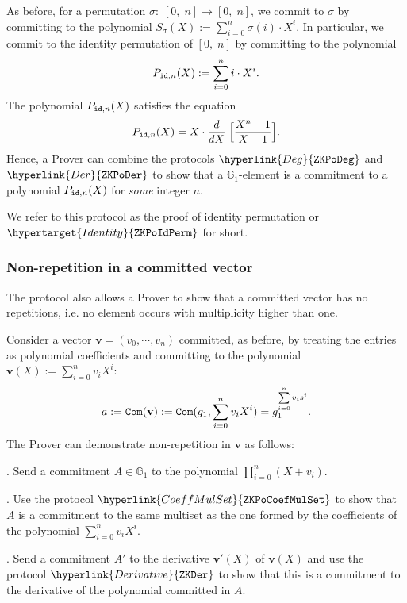 \documentclass[11pt, lettersize, notitlepage, leqno, footskip=0.6cm]{article}
\newcommand{\lra}{\longrightarrow}
\newcommand{\mb}{\mathbb}
\newcommand{\mbf}{\mathbf}
\newcommand{\vs}{\vspace{-0.15cm}}
\newcommand{\noin}{\noindent}
\numberwithin{equation}{section}
\begin{document}
As before, for a permutation $\sigma:\;[0,\;n]\lra [0,\; n]$, we commit to $\sigma$ by committing to the polynomial $S_{\sigma}(X):= \sum_{i=0}^n \sigma(i)\cdot X^i .$ In particular, we commit to the identity permutation of $[0,\;n]$ by committing to the polynomial \vs $$ P_{{\tt{id}}, n}(X):=  \sum\limits_{i=0}^n i\cdot X^i.$$ The polynomial $P_{{\tt{id}}, n}(X)$ satisfies the equation \vs $$ P_{{\tt{id}}, n}(X) = X\cdot \frac{d}{dX}\;\Big[ \frac{X^{n}-1}{X-1} \Big].   $$ Hence, a Prover can combine the protocols $\hyperlink{Deg}{\tt{ZKPoDeg}}$ and $\hyperlink{Der}{\tt{ZKPoDer}}$ to show that a $\mb{G}_1$-element is a commitment to a polynomial $P_{{\tt{id}}, n}(X)$ for \textit{some} integer $n$.

We refer to this protocol as the proof of identity permutation or $\hypertarget{Identity}{\tt{ZKPoIdPerm}}$ for short.


\subsubsection{\fontsize{11}{11}\selectfont Non-repetition in a committed vector}


The protocol also allows a Prover to show that a committed vector has no repetitions, i.e. no element occurs with multiplicity higher than one. 

Consider a vector $\mbf{v} = (v_0,\cdots,v_n)$ committed, as before, by treating the entries as polynomial coefficients and committing to the polynomial $\mbf{v}(X):= \sum_{i=0}^n v_iX^i$: \vs $$ a:= {\tt{Com}}(\mbf{v}):= {\tt{Com}}(g_1,\sum\limits_{i=0}^n v_iX^i ) =  g_1^{\sum\limits_{i=0}^n v_i s^i}. $$ The Prover can demonstrate non-repetition in $\mbf{v}$ as follows: \vspace{2mm}

\noin 1. Send a commitment $A\in \mb{G}_1$ to the polynomial $\prod\limits_{i=0}^n (X+v_i)$. \vspace{1mm}

\noin 2. Use the protocol $\hyperlink{CoeffMulSet}{\tt{ZKPoCoefMulSet}}$ to show that $A$ is a commitment to the same multiset as the one formed by the coefficients of the polynomial $\sum_{i=0}^n v_iX^i$.        \vspace{1mm}

\noin 3. Send a commitment $A'$ to the derivative $\mbf{v}'(X)$ of $\mbf{v}(X)$ and use the protocol $\hyperlink{Derivative}{\tt{ZKDer}}$ to show that this is a commitment to the derivative of the polynomial committed in $A$. \vspace{1mm}
\end{document}

